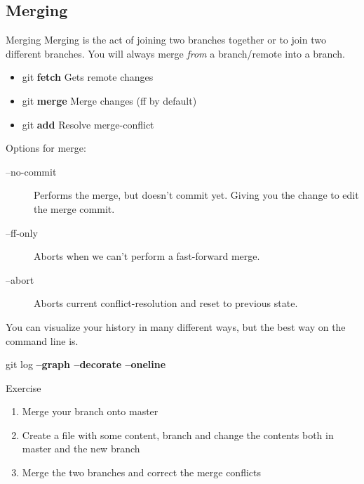 \documentclass{beamer}
\begin{document}
\subsection{Merging}
\begin{frame}[fragile]{Merging}
Merging is the act of joining two branches together or to join two different branches. You will always merge \emph{from} a branch/remote into a branch.
  \begin{block}{}
    \begin{itemize}
      \item git \textbf{fetch}  Gets remote changes
      \item git \textbf{merge}  Merge changes (ff by default)
      \item git \textbf{add}    Resolve merge-conflict
    \end{itemize}

    Options for merge:
    \begin{description}
      \item[--no-commit] Performs the merge, but doesn't commit yet. Giving you the change to edit the merge commit.
      \item[--ff-only]   Aborts when we can't perform a fast-forward merge.
      \item[--abort]     Aborts current conflict-resolution and reset to previous state.
    \end{description}
  \end{block}

  You can visualize your history in many different ways, but the best way on the command line is.\\
  \begin{block}{}
  git log \textbf{--graph --decorate --oneline}
  \end{block}
\end{frame}
\begin{frame}
  \begin{block}{Exercise}
    \begin{enumerate}
      \item Merge your branch onto master
      \item Create a file with some content, branch and change the contents both in master and the new branch
      \item Merge the two branches and correct the merge conflicts
    \end{enumerate}
  \end{block}
\end{frame}
\end{document}
